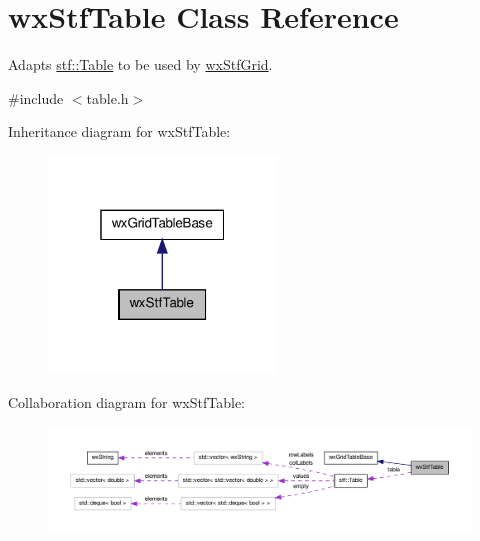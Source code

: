 \hypertarget{classwxStfTable}{
\section{wxStfTable Class Reference}
\label{classwxStfTable}
}


Adapts \hyperlink{classstf_1_1Table}{stf::Table} to be used by \hyperlink{classwxStfGrid}{wxStfGrid}.  




{\ttfamily \#include $<$table.h$>$}



Inheritance diagram for wxStfTable:
\nopagebreak
\begin{figure}[H]
\begin{center}
\leavevmode
\includegraphics[width=172pt]{classwxStfTable__inherit__graph}
\end{center}
\end{figure}


Collaboration diagram for wxStfTable:
\nopagebreak
\begin{figure}[H]
\begin{center}
\leavevmode
\includegraphics[width=400pt]{classwxStfTable__coll__graph}
\end{center}
\end{figure}
